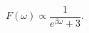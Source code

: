 \begin{equation} \label{analytically-continued-spectrum-schwarzschild}
F(\omega) \propto \frac{1}{e^{\beta \omega} + 3}.
\end{equation}

